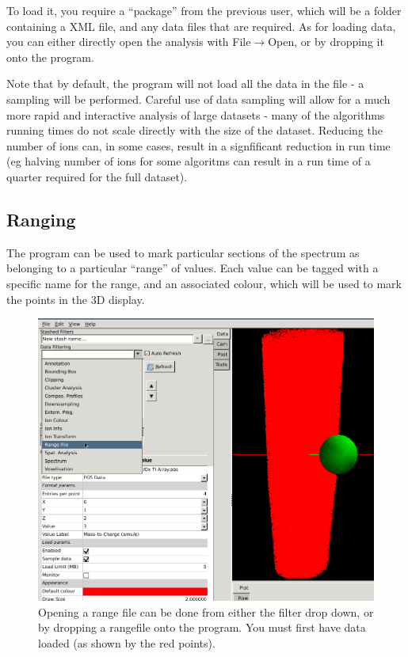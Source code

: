 \documentclass[10pt]{article}
\begin{document}
To load it, you require a ``package'' from the previous user, which will be a folder containing a XML file, and any data files that are required. As for loading data, you can either directly open the analysis with File$\rightarrow$Open, or by dropping it onto the program. 

Note that by default, the program will not load all the data in the file - a sampling will be performed. Careful use of data sampling will allow for a much more rapid and interactive analysis of large datasets - many of the algorithms running times do not scale directly with the size of the dataset. Reducing the number of ions can, in some cases, result in a signfificant reduction in run time (eg halving number of ions for some algoritms can result in a run time of a quarter required for the full dataset).

\subsection{Ranging}
\label{sec:quickStartRangedData}
The program can be used to mark particular sections of the spectrum as belonging to a particular ``range'' of values. Each value can be tagged with a specific name for the range, and an associated colour, which will be used to mark the points in the 3D display.

\begin{figure}[h]
\centering
 \includegraphics[width=0.85 \textwidth,keepaspectratio=true]{./figures/rangeDropdown.png}

 \caption{Opening a range file can be done from either the filter drop down, or by dropping a rangefile onto the program. You must first have data loaded (as shown by the red points).}
\label{fig:rangeDropdown}
\end{figure}
\end{document}
